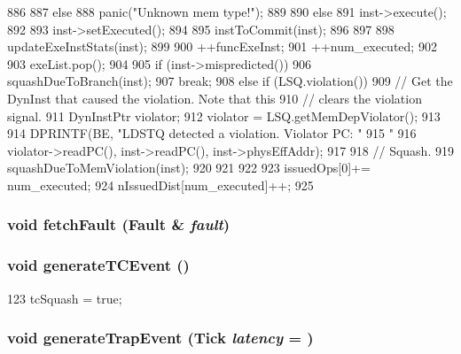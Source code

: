 \begin{DoxyCode}
{{{{{886                 }
887             } else {
888                 panic("Unknown mem type!");
889             }
890         } else {
891             inst->execute();
892 
893             inst->setExecuted();
894 
895             instToCommit(inst);
896         }
897 
898         updateExeInstStats(inst);
899 
900         ++funcExeInst;
901         ++num_executed;
902 
903         exeList.pop();
904 
905         if (inst->mispredicted()) {
906             squashDueToBranch(inst);
907             break;
908         } else if (LSQ.violation()) {
909             // Get the DynInst that caused the violation.  Note that this
910             // clears the violation signal.
911             DynInstPtr violator;
912             violator = LSQ.getMemDepViolator();
913 
914             DPRINTF(BE, "LDSTQ detected a violation.  Violator PC: "
915                     "%
916                     violator->readPC(), inst->readPC(), inst->physEffAddr);
917 
918             // Squash.
919             squashDueToMemViolation(inst);
920         }
921     }
922 
923     issuedOps[0]+= num_executed;
924     nIssuedDist[num_executed]++;
925 }
\end{DoxyCode}
\hypertarget{classLWBackEnd_a71dcc69e5b01fa12b8ccd2dccdcc9917}{
\subsubsection[{fetchFault}]{\setlength{\rightskip}{0pt plus 5cm}void fetchFault ({\bf Fault} \& {\em fault})}}
\label{classLWBackEnd_a71dcc69e5b01fa12b8ccd2dccdcc9917}
\hypertarget{classLWBackEnd_aee57f4aad9f2308dcc12325319c170d5}{
\subsubsection[{generateTCEvent}]{\setlength{\rightskip}{0pt plus 5cm}void generateTCEvent ()}}
\label{classLWBackEnd_aee57f4aad9f2308dcc12325319c170d5}



\begin{DoxyCode}
123 { tcSquash = true; }
\end{DoxyCode}
\hypertarget{classLWBackEnd_a17fd6203f0789b68f99f618ea93ab6e0}{
\subsubsection[{generateTrapEvent}]{\setlength{\rightskip}{0pt plus 5cm}void generateTrapEvent ({\bf Tick} {\em latency} = {})}}
\label{classLWBackEnd_a17fd6203f0789b68f99f618ea93ab6e0}



